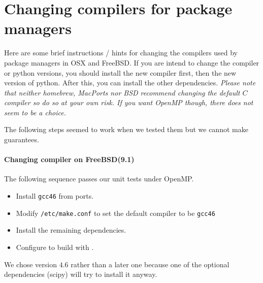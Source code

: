 %
%
%

\chapter{Changing compilers for package managers}
\label{chap:chcomp}

Here are some brief instructions / hints for changing the compilers used by package managers in OSX and FreeBSD.
If you are intend to change the compiler or python versions, you should install the new compiler first,
then the new version of python.
After this, you can install the other dependencies.
\emph{Please note that neither homebrew, MacPorts nor BSD recommend changing the default $C$ compiler so
do so at your own risk.  If you want OpenMP though, there does not seem to be a choice.}

The following steps seemed to work when we tested them but we cannot make guarantees.

\subsubsection*{Changing compiler on FreeBSD(9.1)}
The following sequence passes our unit tests under OpenMP.
\begin{itemize}
 \item Install \texttt{gcc46} from ports.
 \item Modify \texttt{/etc/make.conf} to set the default compiler to be \texttt{gcc46}
 \item Install the remaining dependencies. 
 \item Configure \escript to build with \openmp.
\end{itemize}

We chose version $4.6$ rather than a later one because one of the optional dependencies (scipy) will try to install it anyway.

